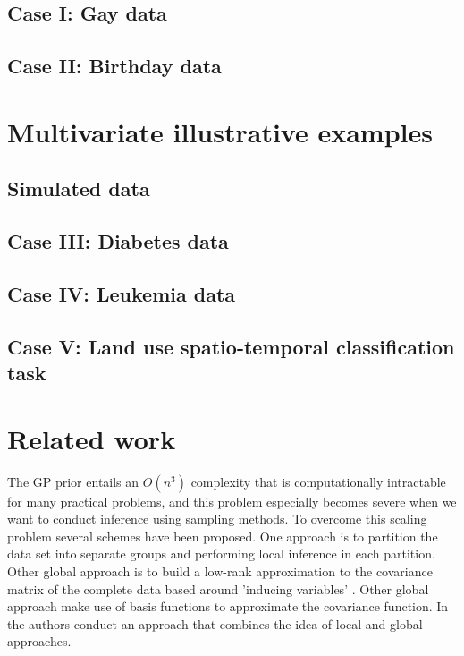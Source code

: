 \documentclass[]{interact}
\theoremstyle{plain}%
\theoremstyle{definition}
\theoremstyle{remark}
\begin{document}
\subsection{Case I: Gay data}\label{sec:bf_caseII}
\subsection{Case II: Birthday data}\label{sec:bf_caseIII}

\vspace{3mm}
\section{Multivariate illustrative examples}\label{sec:gp_examplesMulti}
\subsection{Simulated data}\label{sec:bf_toyexampleMulti}
\subsection{Case III: Diabetes data}\label{sec:bf_caseIV}
\subsection{Case IV: Leukemia data}\label{sec:bf_caseV}
\subsection{Case V: Land use spatio-temporal classification task}\label{sec:bf_caseVII}

\vspace{3mm}
\appendix

\section{Related work}

The GP prior entails an $O(n^3)$ complexity that is computationally intractable for many practical problems, and this problem especially becomes severe when we want to conduct inference using sampling methods. To overcome this scaling problem several schemes have been proposed. One approach is to partition the data set into separate groups \citep{snelson2007local, urtasun2008sparse} and performing local inference in each partition. Other global approach is to build a low-rank approximation to the covariance matrix of the complete data based around 'inducing variables' \citep{quinonero2005unifying,bui2017unifying}. Other global approach make use of basis functions to approximate the covariance function. In \cite{snelson2007local} the authors conduct an approach that combines the idea of local and global approaches.
\end{document}
